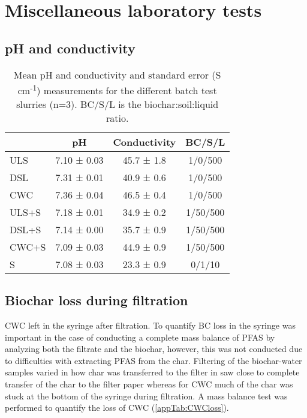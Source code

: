 \chapter{Miscellaneous laboratory tests}\label{appSec:misclab}

\section{pH and conductivity}

\begin{table}[th]
\centering
\caption{Mean pH and conductivity and standard error (\textmu S cm\textsuperscript{-1}) measurements for the different batch test slurries (n=3). BC/S/L is the biochar:soil:liquid ratio.}
\label{apptab:pHcond}
\begin{tabular}{lccc}
\toprule
 & \multicolumn{1}{c}{pH} & \multicolumn{1}{c}{Conductivity} & BC/S/L\\ \midrule
ULS   & 7.10 ± 0.03 & 45.7 ± 1.8 & 1/0/500\\
DSL   & 7.31 ± 0.01 & 40.9 ± 0.6 & 1/0/500\\
CWC   & 7.36 ± 0.04 & 46.5 ± 0.4 & 1/0/500\\
ULS+S & 7.18 ± 0.01 & 34.9 ± 0.2 & 1/50/500\\
DSL+S & 7.14 ± 0.00 & 35.7 ± 0.9 & 1/50/500\\
CWC+S & 7.09 ± 0.03 & 44.9 ± 0.9 & 1/50/500\\
S     & 7.08 ± 0.03 & 23.3 ± 0.9 & 0/1/10\\
\bottomrule
\end{tabular}
\end{table}

\pagebreak
\section{Biochar loss during filtration}
CWC left in the syringe after filtration. To quantify BC loss in the syringe was important in the case of conducting a complete mass balance of PFAS by analyzing both the filtrate and the biochar, however, this was not conducted due to difficulties with extracting PFAS from the char. Filtering of the biochar-water samples varied in how char was transferred to the filter in saw close to complete transfer of the char to the filter paper whereas for CWC much of the char was stuck at the bottom of the syringe during filtration. A mass balance test was performed to quantify the loss of CWC (\cref{appTab:CWCloss}). 

